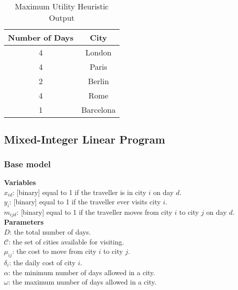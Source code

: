 \documentclass[12pt]{article}
\begin{document}
\begin{table}[ht!]
	\centering
	\begin{tabular}{| c || c |}
		\hline
		Number of Days & City \\ \hline \hline
		4 & London \\ \hline
		4 & Paris \\ \hline
		2 & Berlin \\ \hline
		4 & Rome \\ \hline
		1 & Barcelona \\ \hline
	\end{tabular}
	\caption{Maximum Utility Heuristic Output}
	\label{max_utility_heuristic_output}
\end{table}
 
\pagebreak
\subsection{Mixed-Integer Linear Program}

\subsubsection{Base model}


\textbf{Variables} \\
$x_{id}$: [binary] equal to 1 if the traveller is in city $i$ on day $d$. \\ 	%
$y_{i}$: [binary] equal to 1 if the traveller ever visits city $i$. \\		%
$m_{ijd}$: [binary] equal to 1 if the traveller moves from city $i$ to city $j$ on day $d$. \\	%

\textbf{Parameters}\\
$D$: the total number of days. \\
$\mathcal{C}$: the set of cities available for visiting. \\
$\mu_{ij}$: the cost to move from city $i$ to city $j$. \\
$\delta_{i}$: the daily cost of city $i$. \\
$\alpha$: the minimum number of days allowed in a city. \\
$\omega$: the maximum number of days allowed in a city. \\
\end{document}
